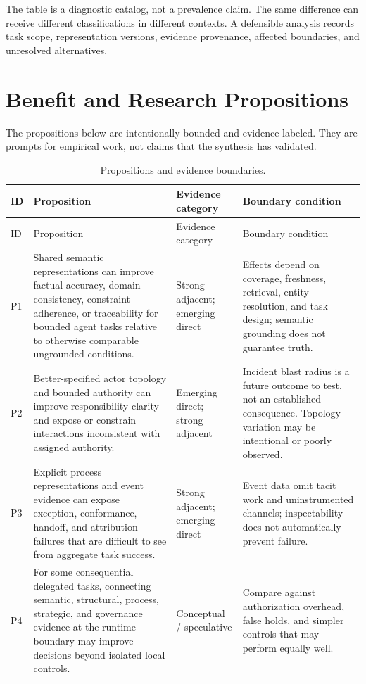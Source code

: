 \documentclass[11pt,letterpaper]{article}
\begin{document}
The table is a diagnostic catalog, not a prevalence claim. The same difference can receive different classifications in different contexts. A defensible analysis records task scope, representation versions, evidence provenance, affected boundaries, and unresolved alternatives.

\section{Benefit and Research Propositions}
The propositions below are intentionally bounded and evidence-labeled. They are prompts for empirical work, not claims that the synthesis has validated.

\begingroup\scriptsize
\begin{longtable}{p{} p{} p{} p{}}
\caption{Propositions and evidence boundaries.}\label{tab:propositions}\\
\toprule
ID & Proposition & Evidence category & Boundary condition \\
\midrule
\endfirsthead
\toprule
ID & Proposition & Evidence category & Boundary condition \\
\midrule
\endhead
P1 & Shared semantic representations can improve factual accuracy, domain consistency, constraint adherence, or traceability for bounded agent tasks relative to otherwise comparable ungrounded conditions. & Strong adjacent; emerging direct & Effects depend on coverage, freshness, retrieval, entity resolution, and task design; semantic grounding does not guarantee truth. \\
P2 & Better-specified actor topology and bounded authority can improve responsibility clarity and expose or constrain interactions inconsistent with assigned authority. & Emerging direct; strong adjacent & Incident blast radius is a future outcome to test, not an established consequence. Topology variation may be intentional or poorly observed. \\
P3 & Explicit process representations and event evidence can expose exception, conformance, handoff, and attribution failures that are difficult to see from aggregate task success. & Strong adjacent; emerging direct & Event data omit tacit work and uninstrumented channels; inspectability does not automatically prevent failure. \\
P4 & For some consequential delegated tasks, connecting semantic, structural, process, strategic, and governance evidence at the runtime boundary may improve decisions beyond isolated local controls. & Conceptual / speculative & Compare against authorization overhead, false holds, and simpler controls that may perform equally well. \\

\end{longtable}
\end{document}
